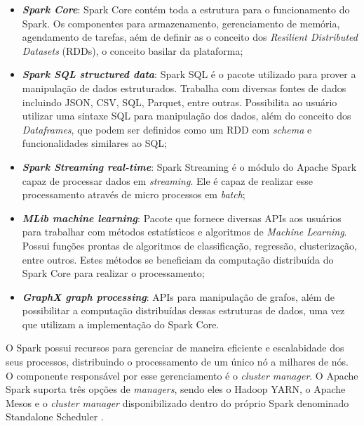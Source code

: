 \begin{itemize}
 \item \textbf{\textit{Spark Core}}: Spark Core contém toda a estrutura para o funcionamento do Spark. Os componentes para armazenamento, gerenciamento de memória, agendamento de tarefas, aém de definir as o conceito dos \textit{Resilient Distributed Datasets} (RDDs), o conceito basilar da plataforma; 
 \item \textbf{\textit{Spark SQL structured data}}: Spark SQL é o pacote utilizado para prover a manipulação de dados estruturados. Trabalha com diversas fontes de dados incluindo JSON, CSV, SQL, Parquet, entre outras. Possibilita ao usuário utilizar uma sintaxe SQL para manipulação dos dados, além do conceito dos \textit{Dataframes}, que podem ser definidos como um RDD com \textit{schema} e funcionalidades similares ao SQL;
 \item \textbf{\textit{Spark Streaming real-time}}: Spark Streaming é o módulo do Apache Spark capaz de processar dados em \textit{streaming}. Ele é capaz de realizar esse processamento através de micro processos em \textit{batch};
 \item \textbf{\textit{MLib machine learning}}: Pacote que fornece diversas APIs aos usuários para trabalhar com métodos estatísticos e algoritmos de \textit{Machine Learning}. Possui funções prontas de algoritmos de classificação, regressão, clusterização, entre outros. Estes métodos se beneficiam da computação distribuída do Spark Core para realizar o processamento;
 \item \textbf{\textit{GraphX graph processing}}: APIs para manipulação de grafos, além de possibilitar a computação distribuídas dessas estruturas de dados, uma vez que utilizam a implementação do Spark Core.
 \end{itemize}
 
O Spark possui recursos para gerenciar de maneira eficiente e escalabidade dos seus processos, distribuindo o processamento de um único nó a milhares de nós. O componente responsável por esse gerenciamento é o \textit{cluster manager}. O Apache Spark suporta três opções de \textit{managers}, sendo eles o Hadoop YARN, o Apache Mesos e o \textit{cluster manager} disponibilizado dentro do próprio Spark denominado Standalone Scheduler \cite{learningspark}.
 
